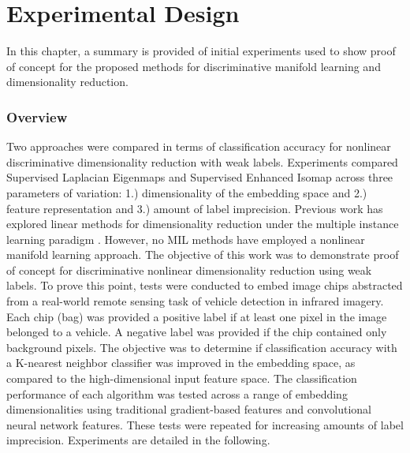 \chapter{Experimental Design}
In this chapter, a summary is provided of initial experiments used to show proof of concept for the proposed methods for discriminative manifold learning and dimensionality reduction. 

\subsection{Overview}
Two approaches were compared in terms of classification accuracy for nonlinear discriminative dimensionality reduction with weak labels.  Experiments compared Supervised Laplacian Eigenmaps and Supervised Enhanced Isomap  across three parameters of variation: 1.) dimensionality of the embedding space and 2.) feature representation and 3.) amount of label imprecision.  Previous work has explored linear methods for dimensionality reduction under the multiple instance learning paradigm \citep{Sun2010MIDR, Ping2010MILDRMaxMargin, Kim2010LocalDRMIL}.  However, no MIL methods have employed a nonlinear manifold learning approach.  The objective of this work was to demonstrate proof of concept for discriminative nonlinear dimensionality reduction using weak labels.  To prove this point, tests were conducted to embed image chips abstracted from a real-world remote sensing task of vehicle detection in infrared imagery.  Each chip (bag) was provided a positive label if at least one pixel in the image belonged to a vehicle.  A negative label was provided if the chip contained only background pixels.  The objective was to determine if classification accuracy with a K-nearest neighbor classifier was improved in the embedding space, as compared to the high-dimensional input feature space.  The classification performance of each algorithm was tested across a range of embedding dimensionalities using traditional gradient-based features and convolutional neural network features.  These tests were repeated for increasing amounts of label imprecision.  Experiments are detailed in the following.   

